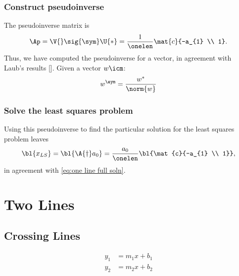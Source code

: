 \subsubsection{Construct pseudoinverse}  %
The pseudoinverse matrix is
  \begin{equation*}   %
      \Ap = \V{} \sig{\sym} \U{*} = \frac{1} {\onelen} \mat{c}{-a_{1} \\ 1}.
  \end{equation*}
Thus, we have computed the pseudoinverse for a vector, in agreement with Laub's results \cite{Laub}[]. Given a vector $w\icm$:
  \begin{equation}   %
    w^{\sym} = \frac{w^{*}} {\norm{w}}
    \label{eq:vectorpi}
  \end{equation}

\subsubsection{Solve the least squares problem}  %
Using this pseudoinverse to find the particular solution for the least squares problem leaves
  \begin{equation}   %
      \bl{x_{LS}} = \bl{\A{\dagger} a_{0}} = \frac{a_{0}}{\onelen} \bl{\mat{c}{-a_{1} \\ 1}},
   \label{eq:one line soln}
  \end{equation}
in agreement with \eqref{eq:one line full soln}.

\section{Two Lines}  %

\subsection{Crossing Lines}  %

  \begin{equation*}   %
    \begin{split}
      y_{1} &= m_{1}x + b_{1} \\
      y_{2} &= m_{2}x + b_{2}
    \end{split}
  \end{equation*}

